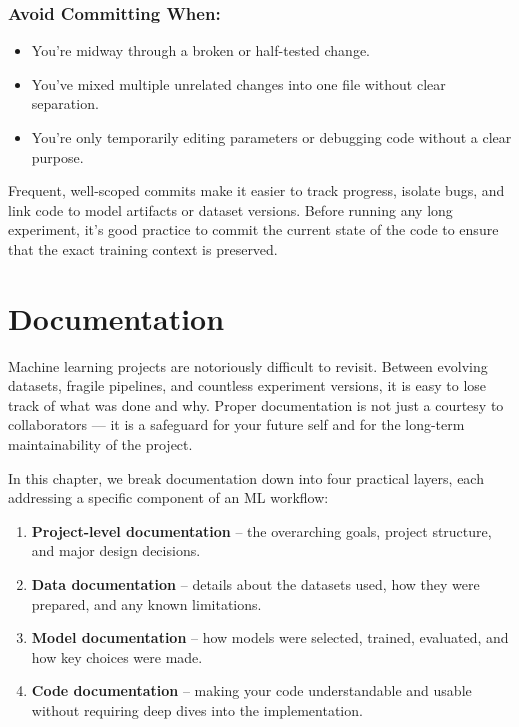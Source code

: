 \documentclass[12pt,openany]{book}
\begin{document}
\subsection*{Avoid Committing When:}
\begin{itemize}
    \item You’re midway through a broken or half-tested change.
    \item You’ve mixed multiple unrelated changes into one file without clear separation.
    \item You’re only temporarily editing parameters or debugging code without a clear purpose.
\end{itemize}

Frequent, well-scoped commits make it easier to track progress, isolate bugs, and link code to model artifacts or dataset versions. Before running any long experiment, it's good practice to commit the current state of the code to ensure that the exact training context is preserved.








\chapter{Documentation}

Machine learning projects are notoriously difficult to revisit. Between evolving datasets, fragile pipelines, and countless experiment versions, it is easy to lose track of what was done and why. Proper documentation is not just a courtesy to collaborators --- it is a safeguard for your future self and for the long-term maintainability of the project.

In this chapter, we break documentation down into four practical layers, each addressing a specific component of an ML workflow:

\begin{enumerate}
    \item \textbf{Project-level documentation} – the overarching goals, project structure, and major design decisions.
    \item \textbf{Data documentation} – details about the datasets used, how they were prepared, and any known limitations.
    \item \textbf{Model documentation} – how models were selected, trained, evaluated, and how key choices were made.
    \item \textbf{Code documentation} – making your code understandable and usable without requiring deep dives into the implementation.
\end{enumerate}
\end{document}
